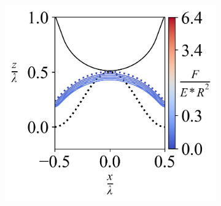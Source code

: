 \begin{figure}[H]
\begin{subfigure}{0.32\textwidth}
    \end{subfigure}
    \hfill
    \begin{subfigure}{0.32\textwidth}
        \centering
        \caption{\label{fig: All-Wave-LineContour-9}}
        \includegraphics[width=1\linewidth]{Figures/Wave-LineContour-9.png}
    \end{subfigure} 

    \vspace{-0.3in}

    
    \caption{\label{fig: All-Wave-ContourPlot} }
\end{figure}